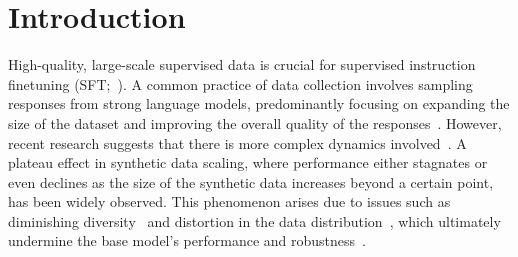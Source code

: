 
\section{Introduction}


High-quality, large-scale supervised data is crucial for supervised instruction finetuning (SFT;~\citealp{Dolly,openassist,zhao2024wildchat,zheng2024lmsyschatm}). A common practice of data collection involves sampling responses from strong language models, predominantly focusing on expanding the size of the dataset and improving the overall quality of the responses~\cite{sun2024principle, alpaca, wang-etal-2023-self-instruct, xu2024magpie, chen2024genqa}. However, recent research suggests that there is more complex dynamics involved~\cite{xu2024strongermodelsstrongerteachers}. A plateau effect in synthetic data scaling, where performance either stagnates or even declines as the size of the synthetic data increases beyond a certain point, has been widely observed.
This phenomenon arises due to issues such as diminishing diversity~\cite{padmakumar2024writing, guo2023curious} and distortion in the data distribution~\cite{lebrun2021evaluating}, which ultimately undermine the base model's performance and robustness~\cite{alemohammad2024selfconsuming, gerstgrasser2024iscollapseinevitable, shumailov2023curse,dohmatob2024strongmodelcollapse,Hataya_2023_ICCV,martínez2023combining,martínez2023understanding,bohacek2023nepotistically,briesch2023large}.


